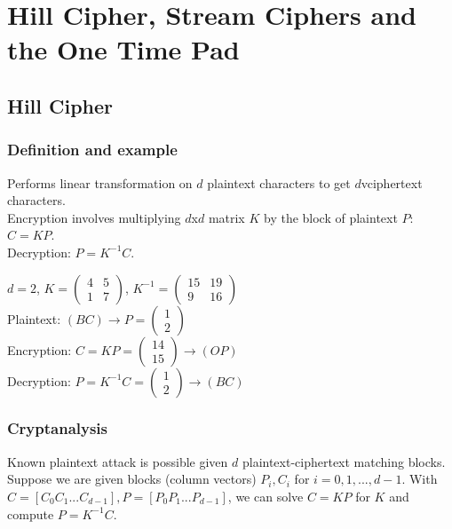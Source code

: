 \documentclass{article}
\begin{document}
\newpage \section{Hill Cipher, Stream Ciphers and the One Time Pad}

\subsection{Hill Cipher}

\subsubsection{Definition and example}

Performs linear transformation on $d$ plaintext characters to get $d$vciphertext characters.\\
Encryption involves multiplying $d$x$d$ matrix $K$ by the block of plaintext $P$: $C= KP$.\\
Decryption: $P = K^{-1} C$.

$d = 2$, $ K = \begin{pmatrix}
4 & 5\\
1 & 7
\end{pmatrix}$, $K^{-1} = \begin{pmatrix}
15 & 19\\
9 & 16
\end{pmatrix}$\\
Plaintext: $(BC) \rightarrow P = \begin{pmatrix}
1\\
2
\end{pmatrix}$\\
Encryption: $C = KP = \begin{pmatrix}
14\\
15
\end{pmatrix} \rightarrow (OP)$\\
Decryption: $P = K^{-1}C = \begin{pmatrix}
1\\
2
\end{pmatrix} \rightarrow (BC)$\\

\subsubsection{Cryptanalysis}

Known plaintext attack is possible given $d$ plaintext-ciphertext matching blocks.\\
Suppose we are given blocks (column vectors) $P_i, C_i$ for $i=0,1,...,d-1$. With $C=[C_0 C_1 ... C_{d-1} ], P = [P_0 P_1 ... P_{d-1} ]$, we can solve $C=KP$ for $K$ and compute $P = K^{-1}C$.
\end{document}
